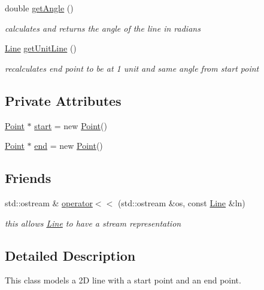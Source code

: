 \begin{DoxyCompactItemize}
double \mbox{\hyperlink{class_jinks_draw_1_1_line_ae344d8ad62e6044cfa2a5d31e1262d00}{get\+Angle}} ()
\begin{DoxyCompactList}\small\item\em calculates and returns the angle of the line in radians \end{DoxyCompactList}\item 
\mbox{\hyperlink{class_jinks_draw_1_1_line}{Line}} \mbox{\hyperlink{class_jinks_draw_1_1_line_a0cfaefbf55c982b045562e34c576ce81}{get\+Unit\+Line}} ()
\begin{DoxyCompactList}\small\item\em recalculates end point to be at 1 unit and same angle from start point \end{DoxyCompactList}\end{DoxyCompactItemize}
\subsection*{Private Attributes}
\begin{DoxyCompactItemize}
\item 
\mbox{\hyperlink{class_jinks_draw_1_1_point}{Point}} $\ast$ \mbox{\hyperlink{class_jinks_draw_1_1_line_a697fccb64f32b900f86dbc89ac69fec3}{start}} = new \mbox{\hyperlink{class_jinks_draw_1_1_point}{Point}}()
\item 
\mbox{\hyperlink{class_jinks_draw_1_1_point}{Point}} $\ast$ \mbox{\hyperlink{class_jinks_draw_1_1_line_a6c04e4d06b7c8bafff608b1ffae6169b}{end}} = new \mbox{\hyperlink{class_jinks_draw_1_1_point}{Point}}()
\end{DoxyCompactItemize}
\subsection*{Friends}
\begin{DoxyCompactItemize}
\item 
std\+::ostream \& \mbox{\hyperlink{class_jinks_draw_1_1_line_a9ed7047351912d1052d709dfa4aac3c9}{operator$<$$<$}} (std\+::ostream \&os, const \mbox{\hyperlink{class_jinks_draw_1_1_line}{Line}} \&ln)
\begin{DoxyCompactList}\small\item\em this allows \mbox{\hyperlink{class_jinks_draw_1_1_line}{Line}} to have a stream representation \end{DoxyCompactList}\end{DoxyCompactItemize}


\subsection{Detailed Description}
This class models a 2D line with a start point and an end point. 

